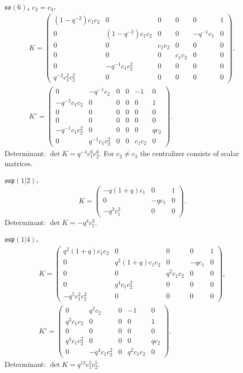 \documentclass[12pt,a4paper]{article}
\newcommand{\so}{\mathfrak{so}}
\newcommand{\osp}{\mathfrak{osp}}
\begin{document}
\textbf{$\so(6)$, $c_2=c_3$.}
\begin{gather} 
K=\begin{pmatrix}  \label{Kso(6)}
(1-q^{-2})c_1c_2 & 0 & 0 & 0 & 0 & 1 \\
0 & (1-q^{-2})c_1c_2 & 0 & 0 & -q^{-1}c_1 & 0 \\
0 & 0 & c_1c_2 & 0 & 0 & 0 \\
0 & 0 & 0 & c_1c_2 & 0 & 0 \\
0 & -q^{-1}c_1c_2^{2} & 0 & 0 & 0 & 0 \\
q^{-2}c_1^{2}c_2^{2} & 0 & 0 & 0 & 0 & 0
\end{pmatrix},\\[4pt]
K'=\begin{pmatrix} \nonumber  %
0 & -q^{-1}c_2 & 0 & 0 & -1 & 0 \\
-q^{-2}c_1c_2 & 0 & 0 & 0 & 0 & 1 \\
0 & 0 & 0 & 0 & 0 & 0 \\
0 & 0 & 0 & 0 & 0 & 0 \\
-q^{-1}c_1c_2^{2} & 0 & 0 & 0 & 0 & qc_2 \\
0 & q^{-1}c_1c_2^{2} & 0 & 0 & c_1c_2 & 0
\end{pmatrix}.
\end{gather}
Determinant: $\det K=q^{-4}c_1^6c_2^6$.
For $c_2\neq c_3$ the centralizer consists of scalar matrices.

\textbf{$\osp(1|2)$.}
\begin{equation} \label{Kosp(1|2)}
K=\begin{pmatrix}
-q(1+q)c_1 & 0 & 1 \\
0 & -qc_1 & 0 \\
-q^{3}c_1^{2} & 0 & 0
\end{pmatrix} .
\end{equation}
Determinant: $\det K=-q^{4}c_1^3$.

\textbf{$\osp(1|4)$.}
\begin{gather}
K=\begin{pmatrix} \label{Kosp(1|4)}
q^{2}(1+q)c_1c_2 & 0 & 0 & 0 & 1 \\
0 & q^{2}(1+q)c_1c_2 & 0 & -qc_1 & 0 \\
0 & 0 & q^{2}c_1c_2 & 0 & 0 \\
0 & q^{4}c_1c_2^{2} & 0 & 0 & 0 \\
-q^{5}c_1^{2}c_2^{2} & 0 & 0 & 0 & 0
\end{pmatrix},\\[4pt]
K'=\begin{pmatrix} \nonumber
0 & q^{2}c_2 & 0 & -1 & 0 \\
q^{3}c_1c_2 & 0 & 0 & 0 & 1 \\
0 & 0 & 0 & 0 & 0 \\
q^{4}c_1c_2^{2} & 0 & 0 & 0 & qc_2 \\
0 & -q^{4}c_1c_2^{2} & 0 & q^{2}c_1c_2 & 0
\end{pmatrix}.
\end{gather}
Determinant: $\det K=q^{12}c_1^5c_2^5$.
\end{document}
